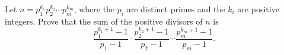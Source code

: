 Let $n=p_1^{k_1}p_2^{k_2}\cdots p_m^{k_m}$, where the $p_i$ are distinct primes and the $k_i$ are positive integers. Prove that the sum of the positive divisors of $n$ is
\[\dfrac{p_1^{k_1+1}-1}{p_1-1}\cdot\dfrac{p_2^{k_2+1}-1}{p_2-1}\cdots\dfrac{p_m^{k_m+1}-1}{p_m-1}.\]
